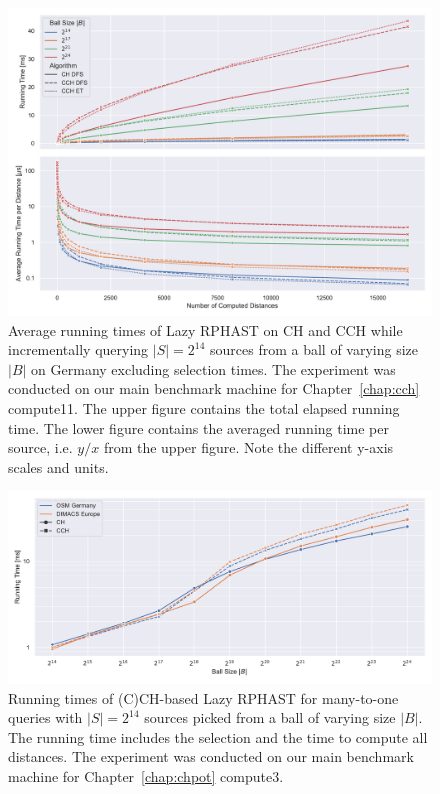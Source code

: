 \documentclass[a4paper, english, cleveref]{lipics-v2021}
\begin{document}
\begin{figure}
\centering
\includegraphics[width=\linewidth]{fig/lazy_rphast_et_vs_dfs_ger.pdf}
\caption{
Average running times of Lazy RPHAST on CH and CCH while incrementally querying $|S| = 2^{14}$ sources from a ball of varying size $|B|$ on Germany excluding selection times.
The experiment was conducted on our main benchmark machine for Chapter~\ref{chap:cch} compute11.
The upper figure contains the total elapsed running time.
The lower figure contains the averaged running time per source, i.e. $y/x$ from the upper figure.
Note the different y-axis scales and units.
}\label{fig:et_vs_dfs_ger}
\end{figure}

\begin{figure}
\centering
\includegraphics[width=\linewidth]{fig/lazy_rphast_many_to_one_both.pdf}
\caption{
Running times of (C)CH-based Lazy RPHAST for many-to-one queries with $|S| = 2^{14}$ sources picked from a ball of varying size $|B|$.
The running time includes the selection and the time to compute all distances.
The experiment was conducted on our main benchmark machine for Chapter~\ref{chap:chpot} compute3.
}\label{fig:many_to_one_ch_vs_cch}
\end{figure}
\end{document}
